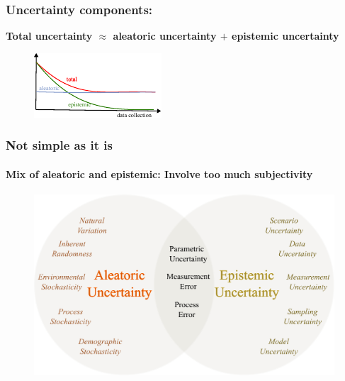 \begin{frame}
\frametitle{Uncertainty components:}
\Large\textbf{Total uncertainty $\approx$ aleatoric uncertainty $+$ epistemic uncertainty}
\begin{figure}
\includegraphics[scale=2.5]{figures/figure-total_Uncertainty.pdf}
\end{figure}

\end{frame}
\begin{frame}
\frametitle{Not simple as it is}
\framesubtitle{Mix of aleatoric and epistemic: Involve too much subjectivity}
\begin{figure}
\includegraphics[scale=0.3]{figures/figure-uncertainty_classification.pdf}
\end{figure}
\end{frame}

